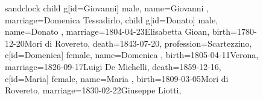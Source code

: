 \documentclass{article}
\begin{document}
\begin{figure}
\begin{minipage}[b]{0.19\textwidth}
    \begin{genealogypicture}[
        processing=database,
        database format=full,
        node size=3.5cm,
        level size=2.8cm,
        level distance=6mm,
        list separators hang=3mm,
        name font=\bfseries,
        surn code={\textcolor{black!50!black}{#1}},
        place text={\newline}{},
        date format=d month yyyy,
        tcbset={male/.style={colframe=blue,colback=blue!5},
        female/.style={colframe=red,colback=red!5}},
        box={fit basedim=7pt,boxsep=2pt,segmentation style=solid,
            halign=left,before upper=\parskip1pt,
            \gtrDBsex,
        },
    ]
    sandclock
    {
        child{
            g[id=Giovanni] {
                male,
                name={Giovanni },
                marriage={Domenica Tessadirlo}{},
            }
            child{
                g[id=Donato] {
                    male,
                    name={Donato },
                    marriage={1804-04-23}{Elisabetta Gioan},
                    birth={1780-12-20}{Mori di Rovereto},
                    death={1843-07-20}{},
                    profession={Scartezzino},
                }
                c[id=Domenica]{
                    female,
                    name={Domenica },
                    birth={1805-04-11}{Verona},
                    marriage={1826-09-17}{Luigi De Michelli},
                    death={1859-12-16}{},
                }
                c[id=Maria]{
                    female,
                    name={Maria },
                    birth={1809-03-05}{Mori di Rovereto},
                    marriage={1830-02-22}{Giuseppe Liotti},
                }
            }
        }
    }
    \end{genealogypicture}

\end{minipage}
\hfill
\begin{minipage}[b]{0.19\textwidth}
\centering


\end{minipage}
\end{figure}
\end{document}
